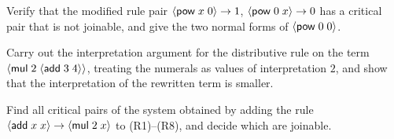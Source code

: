 \begin{exercise}[\dag]\label{ex:ch8-nonconf}
Verify that the modified rule pair $\langle \mathsf{pow}\; x\; 0\rangle\to1$, $\langle \mathsf{pow}\; 0\; x\rangle\to0$ has a critical pair that is not joinable, and give the two normal forms of $\langle \mathsf{pow}\; 0\; 0\rangle$.
\end{exercise}

\begin{exercise}[\dag]\label{ex:ch8-dist}
Carry out the interpretation argument for the distributive rule on the term $\langle \mathsf{mul}\; 2\; \langle \mathsf{add}\; 3\; 4\rangle\rangle$, treating the numerals as values of interpretation $2$, and show that the interpretation of the rewritten term is smaller.
\end{exercise}

\begin{exercise}
Find all critical pairs of the system obtained by adding the rule $\langle \mathsf{add}\; x\; x\rangle\to\langle \mathsf{mul}\; 2\; x\rangle$ to (R1)--(R8), and decide which are joinable.
\end{exercise}
